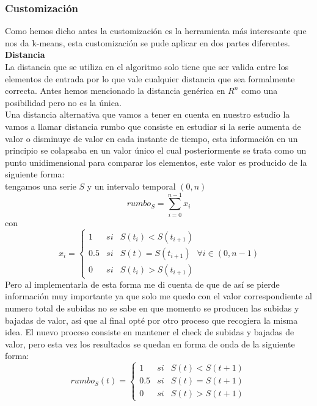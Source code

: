 \documentclass[12pt,a4paper]{article}
\begin{document}
			\subsubsection{Customización}
			Como hemos dicho antes la customización es la herramienta más interesante que nos da k-means, esta customización se pude aplicar en dos partes diferentes.\\
			\textbf{Distancia}\\
			La distancia que se utiliza en el algoritmo solo tiene que ser valida entre los elementos de entrada por lo que vale cualquier distancia que sea formalmente correcta. Antes hemos mencionado la distancia genérica en $R^n$ como una posibilidad pero no es la única.\\
			Una distancia alternativa que vamos a tener en cuenta en nuestro estudio la vamos a llamar distancia rumbo que consiste en estudiar si la serie aumenta de valor o disminuye de valor en cada instante de tiempo, esta información en un principio se colapsaba en un valor único el cual posteriormente se trata como un punto unidimensional para comparar los elementos, este valor es producido de la siguiente forma:\\
			tengamos una serie $S$ y un intervalo temporal $(0,n)$
			\[rumbo_S =\sum_{i=0}^{n-1} x_i \]
			con
			\[x_i= \left\{ \begin{array}{lcc}
             1 &   si & S(t_i) < S(t_{i+1}) \\
             0.5 & si & S(t) = S(t_{i+1})\\
             0 &  si  & S(t_i) > S(t_{i+1})
             \end{array}
   			\right.
			\forall i \in (0,n-1)\]
			Pero al implementarla de esta forma me di cuenta de que de así se pierde información muy importante ya que solo me quedo con el valor correspondiente al numero total de subidas no se sabe en que momento se producen las subidas y bajadas de valor, así que al final opté por otro proceso que recogiera la misma idea. El nuevo proceso consiste en mantener el check de subidas y bajadas de valor, pero esta vez los resultados se quedan en forma de onda de la siguiente forma:\\
			\[rumbo_S(t)= \left\{ \begin{array}{lcc}
             1 &   si & S(t) < S(t+1) \\
			0.5 & si & S(t) = S(t+1)\\
             0 &  si  & S(t) >  S(t+1)
             \end{array}
   			\right.\]
\end{document}

